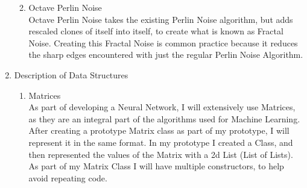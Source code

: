 \begin{flushleft}
\begin{enumerate}
\begin{enumerate}[label=\arabic*)]
                \vspace{0.5cm}
                \item Octave Perlin Noise \\
                Octave Perlin Noise takes the existing Perlin Noise algorithm, but adds rescaled clones of itself into itself, to create
                what is known as Fractal Noise. Creating this Fractal Noise is common practice because it reduces the sharp edges encountered
                with just the regular Perlin Noise Algorithm.

                \vspace{0.5cm}
            \end{enumerate}

        \item {\Large Description of Data Structures} \\
            \large
            \vspace{0.2cm}
            \begin{enumerate}
                \item {\large Matrices} \\
                As part of developing a Neural Network, I will extensively use Matrices, as they are an integral part of the algorithms
                used for Machine Learning. After creating a prototype Matrix class as part of my prototype, I will represent it in the
                same format. In my prototype I created a Class, and then represented the values of the Matrix with a 2d List (List of Lists).
                As part of my Matrix Class I will have multiple constructors, to help avoid repeating code.
            \end{enumerate}
            

    \end{enumerate}
    \vspace{0.1cm}
\end{flushleft}